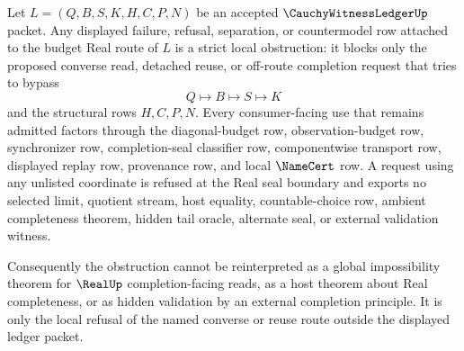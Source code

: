 \begin{corollary}
\label{cor:cauchy-witness-ledger-budget-real-route-strict-local-obstruction}
Let $L=(Q,B,S,K,H,C,P,N)$ be an accepted $\CauchyWitnessLedgerUp$ packet. Any displayed failure, refusal, separation, or countermodel row attached to the budget Real route of $L$ is a strict local obstruction: it blocks only the proposed converse read, detached reuse, or off-route completion request that tries to bypass
$$
Q \longmapsto B \longmapsto S \longmapsto K
$$
and the structural rows $H,C,P,N$. Every consumer-facing use that remains admitted factors through the diagonal-budget row, observation-budget row, synchronizer row, completion-seal classifier row, componentwise transport row, displayed replay row, provenance row, and local $\NameCert$ row. A request using any unlisted coordinate is refused at the Real seal boundary and exports no selected limit, quotient stream, host equality, countable-choice row, ambient completeness theorem, hidden tail oracle, alternate seal, or external validation witness.

Consequently the obstruction cannot be reinterpreted as a global impossibility theorem for $\RealUp$ completion-facing reads, as a host theorem about Real completeness, or as hidden validation by an external completion principle. It is only the local refusal of the named converse or reuse route outside the displayed ledger packet.
\end{corollary}
